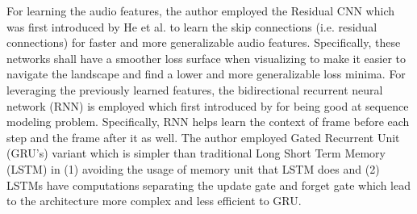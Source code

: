 For learning the audio features, the author employed the Residual CNN which was first introduced by He et al. \cite{} to learn the skip connections (i.e. residual connections) for faster and more generalizable audio features. Specifically, these networks shall have a smoother loss surface when visualizing to make it easier to navigate the landscape and find a lower and more generalizable loss minima.  For leveraging the previously learned features, the bidirectional recurrent neural network (RNN) is employed which first introduced by for being good at sequence modeling problem. Specifically, RNN helps learn the context of frame before each step and the frame after it as well. The author employed Gated Recurrent Unit (GRU's) variant which is simpler than traditional Long Short Term Memory (LSTM) in (1) avoiding the usage of memory unit that LSTM does and (2)  LSTMs have computations  separating the update gate and forget gate which lead to the architecture more complex and less efficient to GRU. 


